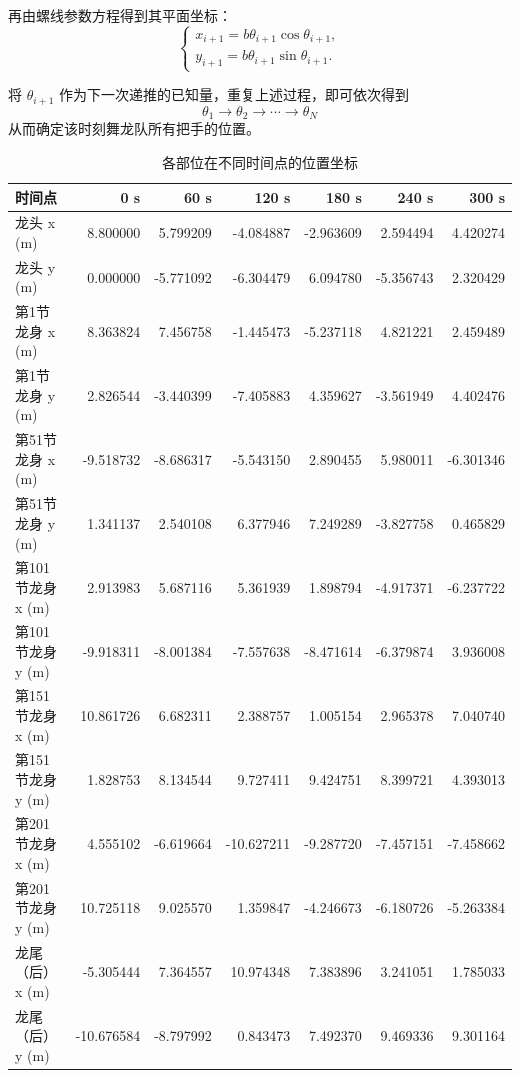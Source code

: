 再由螺线参数方程得到其平面坐标：
\begin{equation}
\begin{cases}
x_{i+1} = b\theta_{i+1}\cos\theta_{i+1},\\[6pt]
y_{i+1} = b\theta_{i+1}\sin\theta_{i+1}.
\end{cases}
\end{equation}

将 $\theta_{i+1}$ 作为下一次递推的已知量，重复上述过程，即可依次得到
\begin{equation}
\theta_1 \rightarrow \theta_2 \rightarrow \cdots \rightarrow \theta_N
\end{equation}
从而确定该时刻舞龙队所有把手的位置。

\begin{table}[htbp]
    \centering
    \small  %
    \caption{各部位在不同时间点的位置坐标}
    \label{tab:position}
    \begin{tabular}{l|r|r|r|r|r|r}
        \hline
        时间点 & 0 s & 60 s & 120 s & 180 s & 240 s & 300 s \\
        \hline
        龙头 x (m)  & 8.800000  & 5.799209  & -4.084887 & -2.963609 & 2.594494  & 4.420274 \\
        龙头 y (m)  & 0.000000  & -5.771092 & -6.304479 & 6.094780  & -5.356743 & 2.320429 \\
        第1节龙身 x (m) & 8.363824  & 7.456758  & -1.445473 & -5.237118 & 4.821221  & 2.459489 \\
        第1节龙身 y (m) & 2.826544  & -3.440399 & -7.405883 & 4.359627  & -3.561949 & 4.402476 \\
        第51节龙身 x (m) & -9.518732 & -8.686317 & -5.543150 & 2.890455  & 5.980011  & -6.301346 \\
        第51节龙身 y (m) & 1.341137  & 2.540108  & 6.377946  & 7.249289  & -3.827758 & 0.465829 \\
        第101节龙身 x (m) & 2.913983  & 5.687116  & 5.361939  & 1.898794  & -4.917371 & -6.237722 \\
        第101节龙身 y (m) & -9.918311 & -8.001384 & -7.557638 & -8.471614 & -6.379874 & 3.936008 \\
        第151节龙身 x (m) & 10.861726 & 6.682311  & 2.388757  & 1.005154  & 2.965378  & 7.040740 \\
        第151节龙身 y (m) & 1.828753  & 8.134544  & 9.727411  & 9.424751  & 8.399721  & 4.393013 \\
        第201节龙身 x (m) & 4.555102  & -6.619664 & -10.627211 & -9.287720 & -7.457151 & -7.458662 \\
        第201节龙身 y (m) & 10.725118 & 9.025570  & 1.359847  & -4.246673 & -6.180726 & -5.263384 \\
        龙尾（后） x (m)  & -5.305444 & 7.364557  & 10.974348 & 7.383896  & 3.241051  & 1.785033 \\
        龙尾（后） y (m)  & -10.676584 & -8.797992 & 0.843473  & 7.492370  & 9.469336  & 9.301164 \\
        \hline
    \end{tabular}
\end{table}



